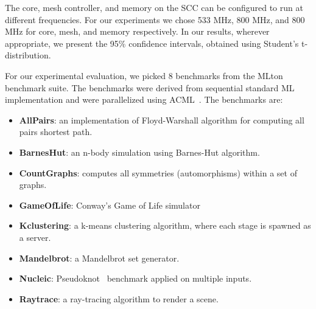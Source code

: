 The core, mesh controller, and memory on the SCC can be configured to run at
different frequencies. For our experiments we chose 533 MHz, 800 MHz, and 800
MHz for core, mesh, and memory respectively. In our results, wherever
appropriate, we present the 95\% confidence intervals, obtained using Student's
t-distribution.

For our experimental evaluation, we picked 8 benchmarks from the MLton
benchmark suite. The benchmarks were derived from sequential standard ML
implementation and were parallelized using ACML~\cite{Ziarek11}. The benchmarks
are:

\begin{itemize}
\item {\bf AllPairs}: an implementation of Floyd-Warshall algorithm for
computing all pairs shortest path.
\item {\bf BarnesHut}: an n-body simulation using Barnes-Hut algorithm.
\item {\bf CountGraphs}: computes all symmetries (automorphisms) within a set
of graphs.
\item {\bf GameOfLife}: Conway's Game of Life simulator
\item {\bf Kclustering}: a k-means clustering algorithm, where each stage is
spawned as a server.
\item {\bf Mandelbrot}: a Mandelbrot set generator.
\item {\bf Nucleic}: Pseudoknot~\cite{Pseudoknot} benchmark applied on multiple
inputs.
\item {\bf Raytrace}: a ray-tracing algorithm to render a scene.
\end{itemize}

